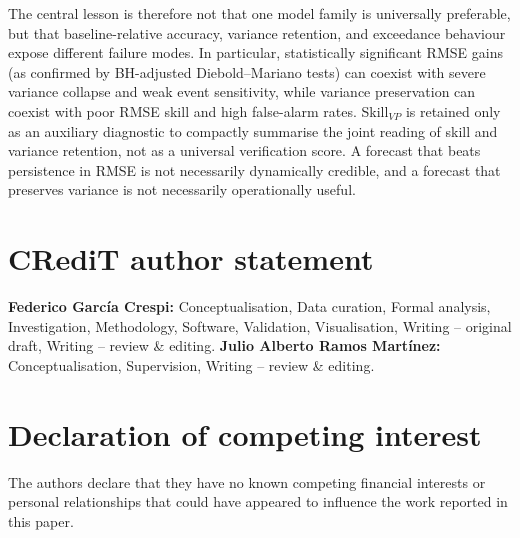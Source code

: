 \documentclass[3p,times,single-column]{elsarticle}
\begin{document}
The central lesson is therefore not that one model family is universally preferable, but that baseline-relative accuracy, variance retention, and exceedance behaviour expose different failure modes. In particular, statistically significant RMSE gains (as confirmed by BH-adjusted Diebold--Mariano tests) can coexist with severe variance collapse and weak event sensitivity, while variance preservation can coexist with poor RMSE skill and high false-alarm rates. Skill$_{VP}$ is retained only as an auxiliary diagnostic to compactly summarise the joint reading of skill and variance retention, not as a universal verification score. A forecast that beats persistence in RMSE is not necessarily dynamically credible, and a forecast that preserves variance is not necessarily operationally useful.

\section*{CRediT author statement}
\textbf{Federico Garc\'ia Crespi:} Conceptualisation, Data curation, Formal analysis, Investigation, Methodology, Software, Validation, Visualisation, Writing -- original draft, Writing -- review \& editing. \textbf{Julio Alberto Ramos Mart\'inez:} Conceptualisation, Supervision, Writing -- review \& editing.

\section*{Declaration of competing interest}
The authors declare that they have no known competing financial interests or personal relationships that could have appeared to influence the work reported in this paper.
\end{document}
